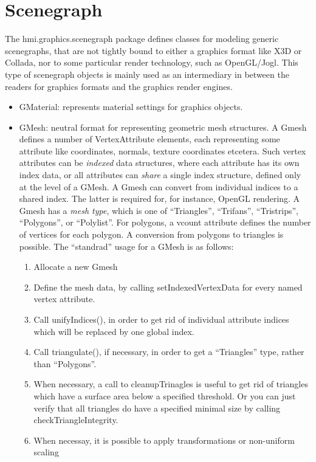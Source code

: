 
\section{Scenegraph}

The hmi.graphics.scenegraph package defines classes for modeling generic
scenegraphs, that are not tightly bound to either a graphics format like X3D or Collada, 
nor to some particular render technology, such as OpenGL/Jogl. 
This type of scenegraph objects is mainly used as an intermediary in between the readers
for graphics formats and the graphics render engines. 

\begin{itemize}
\item GMaterial: represents material settings for graphics objects.
\item GMesh: neutral format for representing geometric mesh structures.
A Gmesh defines a number of VertexAttribute elements, each representing some
attribute like coordinates, normals, texture coordinates etcetera.
Such vertex attributes can be \emph{indexed} data structures, where each attribute
has its own index data, or all attributes can \emph{share} a single index structure,
defined only at the level of a GMesh. A Gmesh can convert from individual indices to
a shared index. The latter is required for, for instance, OpenGL rendering.
A Gmesh has a \emph{mesh type}, which is one of
``Triangles'', ``Trifans'', ``Tristrips'', ``Polygons'', or ``Polylist''.
For polygons, a vcount attribute defines the number of vertices for each polygon.
A conversion from polygons to triangles is possible.
The ``standrad'' usage for a GMesh is as follows:
\begin{enumerate}
\item Allocate a new Gmesh
\item Define the mesh data, by calling setIndexedVertexData for every named vertex attribute.
\item Call unifyIndices(), in order to get rid of individual attribute indices which
will be replaced by one global index.
\item Call triangulate(), if necessary, in order to get a ``Triangles'' type, rather than
``Polygons''.
\item When necessary, a call to cleanupTrinagles is useful to get rid
of triangles which have a surface area below a specified threshold. 
Or you can just verify that all triangles do have a specified minimal size
by calling checkTriangleIntegrity.
\item When necessay, it is possible to apply transformations or non-uniform scaling

\end{enumerate}
\end{itemize}
